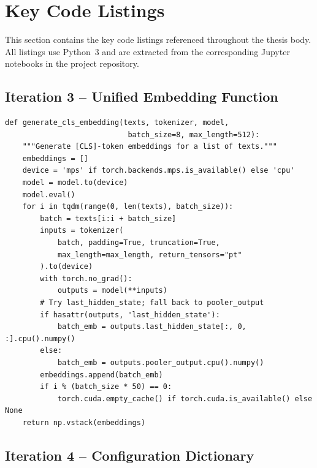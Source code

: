 \documentclass[11pt, titlepage, bibliography=totoc]{scrreprt}
\begin{document}
\section{Key Code Listings}
\label{sec:code-listings}

This section contains the key code listings referenced throughout the thesis body. All listings use Python~3 and are extracted from the corresponding Jupyter notebooks in the project repository.

\subsection*{Iteration 3 -- Unified Embedding Function}

\begin{lstlisting}[label=lst:unified-embedding,
  caption={Unified CLS-token embedding function used in Iteration~3 to handle both standard BERT and E5 model families.}]
def generate_cls_embedding(texts, tokenizer, model,
                            batch_size=8, max_length=512):
    """Generate [CLS]-token embeddings for a list of texts."""
    embeddings = []
    device = 'mps' if torch.backends.mps.is_available() else 'cpu'
    model = model.to(device)
    model.eval()
    for i in tqdm(range(0, len(texts), batch_size)):
        batch = texts[i:i + batch_size]
        inputs = tokenizer(
            batch, padding=True, truncation=True,
            max_length=max_length, return_tensors="pt"
        ).to(device)
        with torch.no_grad():
            outputs = model(**inputs)
        # Try last_hidden_state; fall back to pooler_output
        if hasattr(outputs, 'last_hidden_state'):
            batch_emb = outputs.last_hidden_state[:, 0, :].cpu().numpy()
        else:
            batch_emb = outputs.pooler_output.cpu().numpy()
        embeddings.append(batch_emb)
        if i % (batch_size * 50) == 0:
            torch.cuda.empty_cache() if torch.cuda.is_available() else None
    return np.vstack(embeddings)
\end{lstlisting}

\subsection*{Iteration 4 -- Configuration Dictionary}
\end{document}
